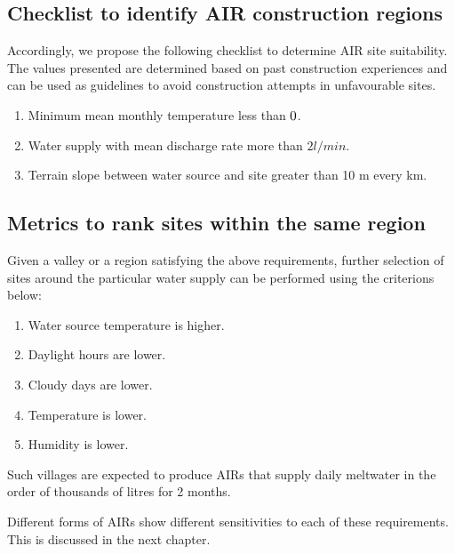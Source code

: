\subsection{Checklist to identify AIR construction regions}

Accordingly, we propose the following checklist to determine AIR site suitability. The values presented are
determined based on past construction experiences and can be used as guidelines to avoid construction attempts
in unfavourable sites.

\begin{enumerate}

  \item Minimum mean monthly temperature less than $0 \degree C$. 
  \item Water supply with mean discharge rate more than $2 l/min$. 
  \item Terrain slope between water source and site greater than 10 m every km. 

\end{enumerate}

\subsection{Metrics to rank sites within the same region }

Given a valley or a region satisfying the above requirements, further selection of sites around the particular
water supply can be performed using the criterions below: 

\begin{enumerate}
  \item Water source temperature is higher.
  \item Daylight hours are lower.
  \item Cloudy days are lower.
  \item Temperature is lower.
  \item Humidity is lower.
\end{enumerate}

Such villages are expected to produce AIRs that supply daily meltwater in the order of thousands of litres for 2
months. 

Different forms of AIRs show different sensitivities to each of these requirements. This is discussed in the
next chapter.
